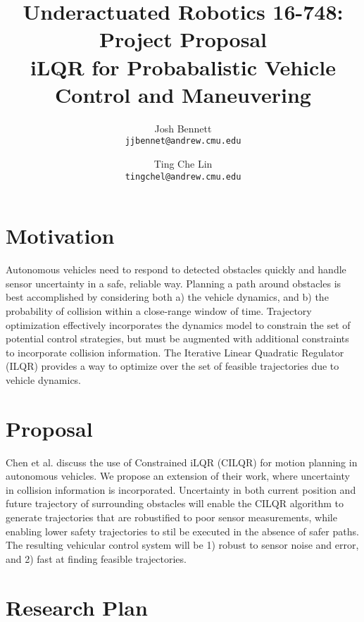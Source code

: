 \documentclass{article}
\theoremstyle{remark}
\theoremstyle{definition}
\begin{document}
\title{Underactuated Robotics 16-748: Project Proposal \\ iLQR for Probabalistic Vehicle Control and Maneuvering}
\author{
  Josh Bennett\\
  \texttt{jjbennet@andrew.cmu.edu}
  \and
  Ting Che Lin\\
  \texttt{tingchel@andrew.cmu.edu}
}
\maketitle

\section{Motivation}

Autonomous vehicles need to respond to detected obstacles quickly and handle sensor uncertainty in a safe, reliable way. Planning a path around obstacles is best accomplished by considering both a) the vehicle dynamics, and b) the probability of collision within a close-range window of time. Trajectory optimization effectively incorporates the dynamics model to constrain the set of potential control strategies, but must be augmented with additional constraints to incorporate collision information. The Iterative Linear Quadratic Regulator (ILQR) provides a way to optimize over the set of feasible trajectories due to vehicle dynamics.

\section{Proposal}

Chen et al. \cite{chen_zhan_tomizuka_2017} discuss the use of Constrained iLQR (CILQR) for motion planning in autonomous vehicles. We propose an extension of their work, where uncertainty in collision information is incorporated. Uncertainty in both current position and future trajectory of surrounding obstacles will enable the CILQR algorithm to generate trajectories that are robustified to poor sensor measurements, while enabling lower safety trajectories to stil be executed in the absence of safer paths. The resulting vehicular control system will be 1) robust to sensor noise and error, and 2) fast at finding feasible trajectories.

\section{Research Plan}
\end{document}
